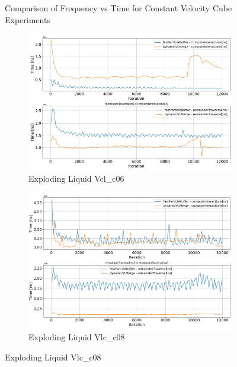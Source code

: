 \begin{figure}[htbp]
    \vspace{1em}
    \caption{Comparison of Frequency vs Time for Constant Velocity Cube Experiments}
    \label{fig:mainConstantVelocityCube}
\end{figure}




\begin{figure}[htbp]
    \centering
    \vspace{-0.5em}
    \begin{subfigure}[b]{\textwidth}
        \centering
        \includegraphics[width=0.9\linewidth]{graphs/explodingLiquid/normalExperiments/freq/vclc0_6inter.png}
        \vspace{-0.5em}
        \caption{\scriptsize Exploding Liquid Vcl\_c06}
        \label{fig:explodingLiquid_vclc0_6inter}
    \end{subfigure}

    \begin{subfigure}[b]{\textwidth}
        \centering
        \includegraphics[width=0.9\linewidth]{graphs/explodingLiquid/normalExperiments/freq/vlc_c08inter.png}
        \vspace{-0.5em}
        \caption{\scriptsize Exploding Liquid Vlc\_c08}
        \label{fig:explodingLiquid_vlc_c08inter}
    \end{subfigure}


\end{figure}
